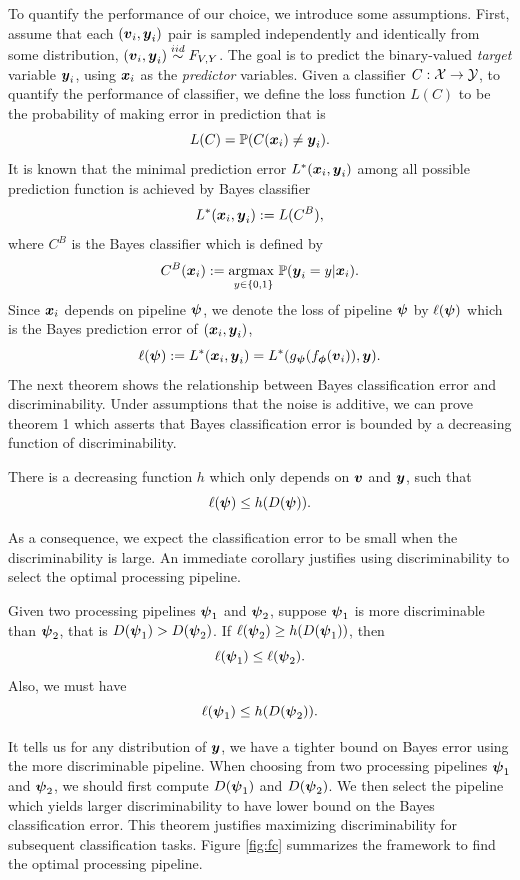 \documentclass{article}
\begin{document}
To quantify the performance of our choice, we introduce some assumptions.  First, assume that each $(\boldsymbol{v}_i,\boldsymbol{y}_i)$ pair is sampled independently and identically from some distribution, $(\boldsymbol{v}_i,\boldsymbol{y}_i) \overset{iid}{\sim} F_{V,Y}$. The goal is to predict the binary-valued \emph{target} variable $\boldsymbol{y}_i$,  using $\boldsymbol{x}_i$ as the \emph{predictor} variables. Given a classifier $C: \mathcal{X} \rightarrow \mathcal{Y}$, to quantify the performance of classifier, we define the loss function $L(C)$ to be the probability of making error in prediction that is
\[L(C) = \mathbb{P}(C(\boldsymbol{x}_i) \neq \boldsymbol{y}_i). \]
It is known that the minimal prediction error $L^*(\boldsymbol{x}_i,\boldsymbol{y}_i)$ among all possible prediction function is achieved by Bayes classifier \cite{devroye2013probabilistic}
\[L^*(\boldsymbol{x}_i,\boldsymbol{y}_i) : = L(C^B),\]
where $C^{B}$ is the Bayes classifier which is defined by
\[C^{B}(\boldsymbol{x}_i):= \underset{y \in \{0,1\} }{\text{argmax }} \mathbb{P}(\boldsymbol{y}_i=y|\boldsymbol{x}_i).\] 
Since $\boldsymbol{x}_i$ depends on pipeline $\boldsymbol{\psi}$, we denote the loss of pipeline $\boldsymbol{\psi}$ by $\ell(\boldsymbol{\psi})$ which is the Bayes prediction error of $(\boldsymbol{x}_i, \boldsymbol{y}_i)$,
\[\ell(\boldsymbol{\psi}):= L^*(\boldsymbol{x}_i,\boldsymbol{y}_i) = L^*(g_{\boldsymbol{\psi}} (f_{\boldsymbol{\phi}} (\boldsymbol{v}_i) ),\boldsymbol{y}). \] 
The next theorem shows the relationship between Bayes classification error and discriminability. Under assumptions that the noise is additive, we can prove theorem 1 which asserts that Bayes classification error is bounded by a decreasing function of discriminability. 
\begin{thm}	
	There is a decreasing function $h$ which only depends on $\boldsymbol{v}$ and $\boldsymbol{y}$, such that
	\[\ell(\boldsymbol{\psi}) \leq h(D(\boldsymbol{\psi})) .\]
	\label{thm1}
\end{thm}
As a consequence, we expect the classification error to be small when the discriminability is large. An immediate corollary justifies using discriminability to select the optimal processing pipeline. 
\begin{coro}	
	Given two processing pipelines $\boldsymbol{\psi}_1$ and $\boldsymbol{\psi}_2$, suppose $\boldsymbol{\psi}_1$ is more discriminable than $\boldsymbol{\psi}_2$, that is $D(\boldsymbol{\psi}_1) > D(\boldsymbol{\psi}_2)$. If $\ell(\boldsymbol{\psi}_2) \geq h(D(\boldsymbol{\psi}_1))$, then
	\[ \ell(\boldsymbol{\psi}_1) \leq \ell(\boldsymbol{\psi}_2). \] 
	Also, we must have
	\[ \ell(\boldsymbol{\psi}_1) \leq h(D(\boldsymbol{\psi}_2)). \]
	
\end{coro}
It tells us for any distribution of $\boldsymbol{y}$, we have a tighter bound on Bayes error using the more discriminable pipeline. When choosing from two processing pipelines $\boldsymbol{\psi}_1$ and $\boldsymbol{\psi}_2$, we should first compute $D(\boldsymbol{\psi}_1)$ and $D(\boldsymbol{\psi}_2)$. We then select the pipeline which yields larger discriminability to have lower bound on the Bayes classification error. This theorem justifies maximizing discriminability for subsequent classification tasks. Figure \ref{fig:fc} summarizes the framework to find the optimal processing pipeline. 
\end{document}
